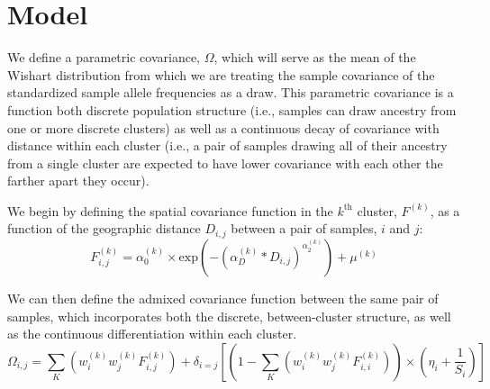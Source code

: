 \documentclass[12pt]{article}
\begin{document}
\section{Model}
We define a parametric covariance, $\Omega$, which will serve as 
the mean of the Wishart distribution from which we are treating 
the sample covariance of the standardized sample allele frequencies 
as a draw.  This parametric covariance is a function both discrete population 
structure (i.e., samples can draw ancestry from one or more discrete clusters) 
as well as a continuous decay of covariance with distance within each cluster 
(i.e., a pair of samples drawing all of their ancestry from a single cluster are expected 
to have lower covariance with each other the farther apart they occur).

We begin by defining the spatial covariance function in the $k^{\text{th}}$ cluster, $F^{(k)}$, 
as a function of the geographic distance $D_{i,j}$ between a pair of samples, $i$ and $j$:
\begin{equation}
F^{(k)}_{i,j} = \alpha^{(k)}_0 \times \text{exp} \left(-\left( \alpha^{(k)}_D * D_{i,j}	\right)^{\alpha^{(k)}_2}	\right) + \mu^{(k)}
\label{spatial_cov}
\end{equation}

We can then define the admixed covariance function between the same pair of samples, 
which incorporates both the discrete, between-cluster structure, as well as the continuous 
differentiation within each cluster.
\begin{equation}
\Omega_{i,j} = \sum\limits_K \left(	w^{(k)}_iw^{(k)}_j F^{(k)}_{i,j} \right) + 
	\delta_{i=j} \left[
		\left(1-\sum\limits_K \left(	w^{(k)}_iw^{(k)}_j F^{(k)}_{i,i}\right)\right) \times 
		\left( \eta_i + \frac{1}{S_i} \right)
			\right]
\label{ad_cov_spMultiK}
\end{equation}
\end{document}
